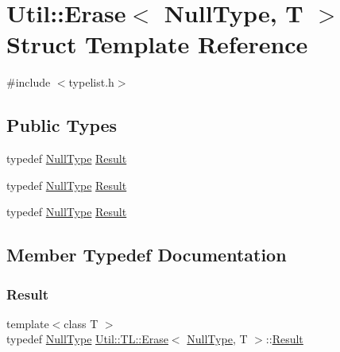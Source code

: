 \hypertarget{structUtil_1_1TL_1_1Erase_3_01NullType_00_01T_01_4}{}\section{Util\+:\+:Erase$<$ Null\+Type, T $>$ Struct Template Reference}
\label{structUtil_1_1TL_1_1Erase_3_01NullType_00_01T_01_4}


{\ttfamily \#include $<$typelist.\+h$>$}

\subsection*{Public Types}
\begin{DoxyCompactItemize}
\item 
typedef \mbox{\hyperlink{classUtil_1_1NullType}{Null\+Type}} \mbox{\hyperlink{structUtil_1_1TL_1_1Erase_3_01NullType_00_01T_01_4_a322fc628c66685b497fdb4d01f456b18}{Result}}
\item 
typedef \mbox{\hyperlink{classUtil_1_1NullType}{Null\+Type}} \mbox{\hyperlink{structUtil_1_1TL_1_1Erase_3_01NullType_00_01T_01_4_a322fc628c66685b497fdb4d01f456b18}{Result}}
\item 
typedef \mbox{\hyperlink{classUtil_1_1NullType}{Null\+Type}} \mbox{\hyperlink{structUtil_1_1TL_1_1Erase_3_01NullType_00_01T_01_4_a322fc628c66685b497fdb4d01f456b18}{Result}}
\end{DoxyCompactItemize}


\subsection{Member Typedef Documentation}
\mbox{\label{structUtil_1_1TL_1_1Erase_3_01NullType_00_01T_01_4_a322fc628c66685b497fdb4d01f456b18}} 
\subsubsection{\texorpdfstring{Result}{Result}\hspace{0.1cm}{\footnotesize\ttfamily [1/3]}}
{\footnotesize\ttfamily template$<$class T $>$ \\
typedef \mbox{\hyperlink{classUtil_1_1NullType}{Null\+Type}} \mbox{\hyperlink{structUtil_1_1TL_1_1Erase}{Util\+::\+T\+L\+::\+Erase}}$<$ \mbox{\hyperlink{classUtil_1_1NullType}{Null\+Type}}, T $>$\+::\mbox{\hyperlink{structUtil_1_1TL_1_1Erase_3_01NullType_00_01T_01_4_a322fc628c66685b497fdb4d01f456b18}{Result}}}

